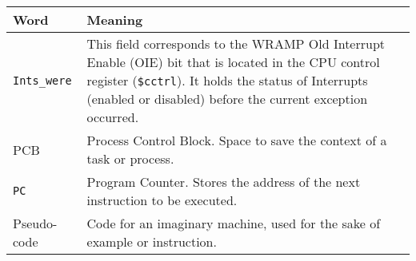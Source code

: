 \documentclass[a4paper,10pt]{article}
\begin{document}
\begin{tabular}{lp{10cm}}
Word & Meaning\\ 

\hline \verb+Ints_were+ & This field corresponds to the WRAMP Old
Interrupt Enable (OIE) bit that is located in the CPU control register
(\texttt{\$cctrl}).  It holds the status of Interrupts (enabled or
disabled) before the current exception occurred.\\

PCB & Process Control Block. Space to save the context of a task or
process.\\

\verb+PC+ & Program Counter. Stores the address of the next
instruction to be executed.\\

Pseudo-code & Code for an imaginary machine, used for the sake of
example or instruction.\\
\end{tabular}

\thispagestyle{rcsfooters}
\pagestyle{rcsfooters}
\end{document}
